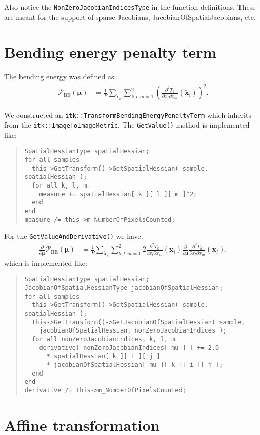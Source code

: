 \documentclass[]{article}
\newcommand{\vmu}{\bm{\mu}}
\newcommand{\vxt}[1][]{\bm{\widetilde x}_{#1}}
\newcommand{\D}[2]{\frac{\partial #1}{\partial #2}}
\newcommand{\Dd}[3]{\frac{\partial^2 #1}{\partial #2 \partial #3}}
\begin{document}
Also notice the \texttt{NonZeroJacobianIndicesType} in the function
definitions. These are meant for the support of sparse Jacobians,
JacobianOfSpatialJacobians, etc.

\section{Bending energy penalty term}

The bending energy was defined as:
\begin{align}
\mathcal{P}_{\mathrm{BE}}(\vmu) &= \frac{1}{P} \sum_{\vxt[i]}
\sum_{k,l,m = 1}^2 \left( \Dd{T_k}{x_l}{x_m}(\vxt[i]) \right)^2.
\end{align}

We constructed an \texttt{itk::TransformBendingEnergyPenaltyTerm}
which inherits from the \texttt{itk::ImageToImage\-Metric}. The
\texttt{GetValue()}-method is implemented like:
\begin{quote}
\begin{verbatim}
SpatialHessianType spatialHessian;
for all samples
  this->GetTransform()->GetSpatialHessian( sample, spatialHessian );
  for all k, l, m
    measure += spatialHessian[ k ][ l ][ m ]^2;
  end
end
measure /= this->m_NumberOfPixelsCounted;
\end{verbatim}
\end{quote}

For the \texttt{GetValueAndDerivative()} we have:
\begin{align}
\D{}{\vmu} \mathcal{P}_{\mathrm{BE}}(\vmu) &=  \frac{1}{P}
\sum_{\vxt[i]} \sum_{k,l,m = 1}^2 2 \Dd{T_k}{x_l}{x_m} (\vxt[i])
\D{}{\vmu} \Dd{T_k}{x_l}{x_m}(\vxt[i]),
\end{align}
which is implemented like:
\begin{quote}
\begin{verbatim}
SpatialHessianType spatialHessian;
JacobianOfSpatialHessianType jacobianOfSpatialHessian;
for all samples
  this->GetTransform()->GetSpatialHessian( sample, spatialHessian );
  this->GetTransform()->GetJacobianOfSpatialHessian( sample,
    jacobianOfSpatialHessian, nonZeroJacobianIndices );
  for all nonZeroJacobianIndices, k, l, m
    derivative[ nonZeroJacobianIndices[ mu ] ] += 2.0
      * spatialHessian[ k ][ i ][ j ]
      * jacobianOfSpatialHessian[ mu ][ k ][ i ][ j ];
  end
end
derivative /= this->m_NumberOfPixelsCounted;
\end{verbatim}
\end{quote}

\section{Affine transformation}
\end{document}

